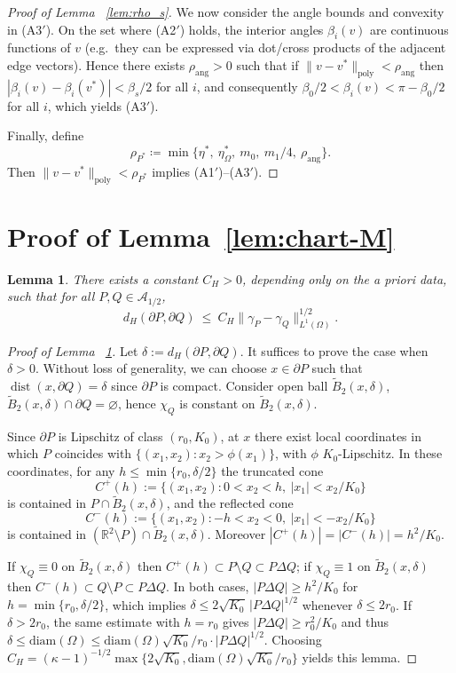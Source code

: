 \documentclass{article}
\newtheorem{lemma}[theorem]{Lemma}
\newcommand{\diam}{\mathrm{diam}}
\newcommand{\dist}{\operatorname{dist}}
\begin{document}
\begin{proof}[Proof of Lemma ~\ref{lem:rho_s}]
We now consider the angle bounds and convexity in (A3$'$). On the set where \textup{(A2$'$)} holds, the interior angles $\beta_i(v)$ are continuous functions of $v$
(e.g.\ they can be expressed via dot/cross products of the adjacent edge vectors).
Hence there exists $\rho_{\mathrm{ang}}>0$ such that if $\|v-v^\ast\|_{\mathrm{poly}}<\rho_{\mathrm{ang}}$ then
$|\beta_i(v)-\beta_i(v^\ast)|<\beta_s/2$ for all $i$, and consequently
$\beta_0/2<\beta_i(v)<\pi-\beta_0/2$ for all $i$, which yields \textup{(A3$'$)}.

Finally, define
\[
\rho_{P^\ast}\coloneqq \min\Big\{\eta^\ast,\ \eta_\Omega^\ast,\ m_0,\ m_1/4,\ \rho_{\mathrm{ang}}\Big\}.
\]
Then $\|v-v^\ast\|_{\mathrm{poly}}<\rho_{P^\ast}$ implies \textup{(A1$'$)--(A3$'$)}.
\end{proof}

\section{Proof of Lemma~\ref{lem:chart-M}}
\label{sec:chart-M}

\begin{lemma}\label{lem:L1_to_H_poly}
There exists a constant $C_H>0$, depending only on the a priori data, such that for all
$P,Q\in\mathcal A_{1/2}$,
\[
d_H(\partial P,\partial Q)\ \le\ C_H\|\gamma_P-\gamma_Q\|_{L^1(\Omega)}^{1/2}.
\]
\end{lemma}

\begin{proof}[Proof of Lemma ~\ref{lem:L1_to_H_poly}]
Let $\delta:=d_H(\partial P,\partial Q)$. It suffices to prove the case when $\delta>0$. Without loss of generality, we can choose $x\in\partial P$ such that $\dist(x,\partial Q)=\delta$ since $\partial P$ is compact. Consider open ball $\tilde{B}_2(x,\delta)$, $\tilde{B}_2(x,\delta)\cap\partial Q=\varnothing$, hence $\chi_Q$ is constant on $\tilde{B}_2(x,\delta)$.

Since $\partial P$ is Lipschitz of class $(r_0,K_0)$, at $x$ there exist local coordinates in which
$P$ coincides with $\{(x_1,x_2): x_2>\phi(x_1)\}$, with $\phi$ $K_0$-Lipschitz.
In these coordinates, for any $h\le \min\{r_0,\delta/2\}$ the truncated cone
\[
C^+(h):=\{(x_1,x_2): 0<x_2<h,\ |x_1|<x_2/K_0\}
\]
is contained in $P\cap \tilde{B}_2(x,\delta)$, and the reflected cone
\[
C^-(h):=\{(x_1,x_2): -h<x_2<0,\ |x_1|<-x_2/K_0\}
\]
is contained in $(\mathbb R^2\setminus P)\cap \tilde{B}_2(x,\delta)$.
Moreover $|C^+(h)|=|C^-(h)|=h^2/K_0$.

If $\chi_Q\equiv 0$ on $\tilde{B}_2(x,\delta)$ then $C^+(h)\subset P\setminus Q\subset P\Delta Q$; if $\chi_Q\equiv 1$ on $\tilde{B}_2(x,\delta)$ then $C^-(h)\subset Q\setminus P\subset P\Delta Q$.
In both cases, $|P\Delta Q|\ge h^2/K_0$ for $h=\min\{r_0,\delta/2\}$, which implies
$\delta\le 2\sqrt{K_0}\,|P\Delta Q|^{1/2}$ whenever $\delta\le 2r_0$.
If $\delta>2r_0$, the same estimate with $h=r_0$ gives $|P\Delta Q|\ge r_0^2/K_0$ and thus
$\delta\le \diam(\Omega)\le \diam(\Omega)\sqrt{K_0}/r_0\cdot |P\Delta Q|^{1/2}$.
Choosing $C_H = (\kappa-1)^{-1/2}\max \{2\sqrt{K_0}, \diam(\Omega)\sqrt{K_0}/r_0\}$ yields this lemma. 
\end{proof}
\end{document}
